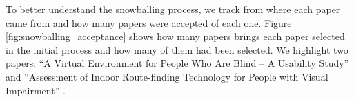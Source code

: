 \begin{table}[h]
	\captionsetup{width=11cm}%
    \end{table}

To better understand the snowballing process, we track from where each paper came from and how many papers were accepted of each one. Figure \ref{fig:snowballing_acceptance} shows how many papers brings each paper selected in the initial process and how many of them had been selected. We highlight two papers: ``A Virtual Environment for People Who Are Blind – A Usability Study'' \cite{201219} and ``Assessment of Indoor Route-finding Technology for People with Visual Impairment'' \cite{20105}.

 	\begin{figure}[h] 
   	    \captionsetup{width=16cm}%
	\end{figure}


